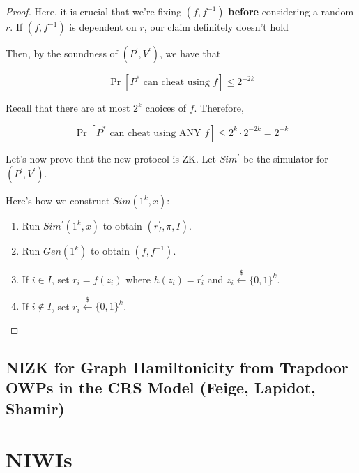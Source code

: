 \documentclass{article}
\theoremstyle{definition}
\newcommand{\bitstring}[1]{\{0,1\}^{#1}}
\begin{document}
\begin{proof}
    Here, it is crucial that we're fixing $(f,f^{-1})$ \textbf{before} considering a random $r$. If 
    $(f,f^{-1})$ is dependent on $r$, our claim definitely doesn't hold

    Then, by the soundness of $(P^{\prime}, V^{\prime})$, we have that 

    \[ \Pr[\text{$P^{*}$ can cheat using $f$}] \leq 2^{-2k} \] 

    Recall that there are at most $2^{k}$ choices of $f$. Therefore,

    \[ \Pr[\text{$P^{*}$ can cheat using ANY $f$}] \leq 2^{k} \cdot 2^{-2k} = 2^{-k} \]
    
    Let's now prove that the new protocol is ZK. Let $Sim^{\prime}$ be the simulator for $(P^{\prime}, V^{\prime})$.

    Here's how we construct $Sim(1^{k},x)$:

    \begin{enumerate}
        \item Run $Sim^{\prime}(1^{k},x)$ to obtain $(r^{\prime}_{I}, \pi, I)$.
        \item Run $Gen(1^{k})$ to obtain $(f,f^{-1})$.
        \item If $i \in I$, set $r_{i} = f(z_{i})$ where $h(z_{i}) = r_{i}^{\prime}$ and $z_{i} \xleftarrow{\$} \bitstring{k}$.
        \item If $i \notin I$, set $r_{i} \xleftarrow{\$} \bitstring{k}$.
    \end{enumerate}


\end{proof}

\subsection{NIZK for Graph Hamiltonicity from Trapdoor OWPs in the CRS Model (Feige, Lapidot, Shamir)}

\newpage

\section{NIWIs}
\end{document}
